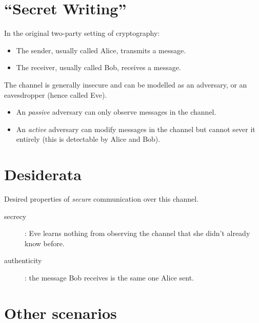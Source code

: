 \documentclass[12pt]{article}
\begin{document}
\MakeScribeTop

\def\Var{{\rm Var}\,}
\def\qopnamewl@#1{\mathop{\fam\z@#1}\nlimits@}
\def\Exp{\mathop{\rm {E}}}
\def\Stab{\mathop{\rm {Stab}}}
\def\Inf{\mathop{\rm {Inf}}}
\def\maj{\mathop{\rm {maj}}}
\def\sgn{\mathop{\rm {sgn}}}
\def\dist{{\rm dist}\,}
\section{``Secret Writing''}

In the original two-party setting of cryptography:

\begin{itemize}
\item The sender, usually called Alice, transmits a message.
\item The receiver, usually called Bob, receives a message.
\end{itemize}

The channel is generally insecure and can be modelled as an adversary,
or an eavesdropper (hence called Eve).

\begin{itemize}
\item
An \textit{passive} adversary can only observe messages in the channel.
\item
An \textit{active} adversary can modify messages in the channel but cannot
sever it entirely (this is detectable by Alice and Bob).
\end{itemize}

\section{Desiderata}

Desired properties of \textit{secure} communication over this channel.

\begin{description}
\item[secrecy]: Eve learns nothing from observing the channel that she didn't
already know before.
\item[authenticity]: the message Bob receives is the same one Alice sent.
\end{description}

\section{Other scenarios}
\end{document}
